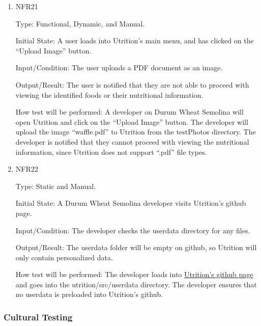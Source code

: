 \documentclass[12pt, titlepage]{article}
\begin{document}
\begin{enumerate}

\item{NFR21\\} 

Type: Functional, Dynamic, and Manual.

Initial State: A user loads into Utrition’s main menu, and has clicked on the “Upload Image” button.

Input/Condition: The user uploads a PDF document as an image.

Output/Result: The user is notified that they are not able to proceed with viewing the identified foods or their nutritional information.

How test will be performed: A developer on Durum Wheat Semolina will open Utrition and click on the “Upload Image” button. The developer will upload the image “waffle.pdf” to Utrition from the testPhotos directory. The developer is notified that they cannot proceed with viewing the nutritional information, since Utrition does not support “.pdf” file types.

\item{NFR22\\} 

Type: Static and Manual.

Initial State: A Durum Wheat Semolina developer visits Utrition’s github page.

Input/Condition: The developer checks the userdata directory for any files.

Output/Result: The userdata folder will be empty on github, so Utrition will only contain personalized data.

How test will be performed: The developer loads into \href{https://github.com/jeff-rey-wang/utrition/}{Utrition’s github page} and goes into the utrition/src/userdata directory. The developer ensures that no userdata is preloaded into Utrition’s github.


\end{enumerate}

\subsubsection{Cultural Testing}

\end{document}
